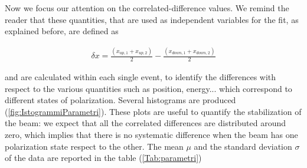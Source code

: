 Now we focus our attention on the correlated-difference values. We remind the reader that these quantities, that are used as independent variables for the fit, as explained before, are defined as 

\begin{align*}
\delta x =  \frac{(x_{up,1} + x_{up,2})}{2} - \frac{(x_{down,1} + x_{down,2})}{2}
\end{align*}

and are calculated within each single event, to identify the differences with respect to the various quantities such as position, energy... which correspond to different states of polarization.
Several histograms are produced (\ref{fig:IstogrammiParametri}). These plots are useful to quantify the stabilization of the beam: we expect that all the correlated differences are distributed around zero, which implies that there is no systematic difference when the beam has one polarization state respect to the other. The mean $\mu$ and the standard deviation $\sigma$ of the data are reported in the table (\ref{Tab:parametri}) 

